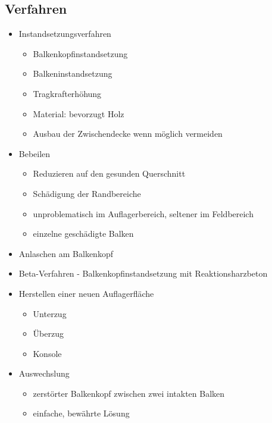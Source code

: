 \documentclass[fleqn,twoside,dvipsnames]{article}
\begin{document}
    \subsection{Verfahren}
        \begin{itemize}
            \item Instandsetzungsverfahren
                \begin{itemize}
                    \item Balkenkopfinstandsetzung
                    \item Balkeninstandsetzung
                    \item Tragkrafterhöhung
                    \item Material: bevorzugt Holz
                    \item Ausbau der Zwischendecke wenn möglich vermeiden
                \end{itemize}
            \item Bebeilen \label{Bebeilen}
                \begin{itemize}
                    \item Reduzieren auf den gesunden Querschnitt
                    \item Schädigung der Randbereiche
                    \item unproblematisch im Auflagerbereich, seltener im Feldbereich
                    \item einzelne geschädigte Balken
                \end{itemize}
            \item Anlaschen am Balkenkopf
            \item Beta-Verfahren - Balkenkopfinstandsetzung mit Reaktionsharzbeton
            \item Herstellen einer neuen Auflagerfläche
                \begin{itemize}
                    \item Unterzug
                    \item Überzug
                    \item Konsole
                \end{itemize}
            \item Auswechslung
                \begin{itemize}
                    \item zerstörter Balkenkopf zwischen zwei intakten Balken
                    \item einfache, bewährte Lösung

\end{itemize}
\end{itemize}
\end{document}
